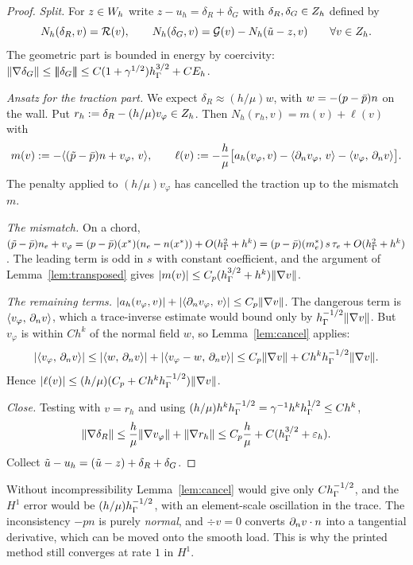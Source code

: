 \begin{proof}
\emph{Split.} For $z\in W_h$ write $z-u_h=\delta_R+\delta_G$ with $\delta_R,\delta_G\in Z_h$ defined by
\[
N_h(\delta_R,v)=\mathcal R(v),\qquad N_h(\delta_G,v)=\mathcal G(v)-N_h(\tilde u-z,v)\qquad\forall v\in Z_h .
\]
The geometric part is bounded in energy by coercivity: $\lVert \nabla\delta_G\rVert\le|\!|\!|\delta_G|\!|\!|\le C(1+\gamma^{1/2})h_\Gamma^{3/2}+CE_h$.

\emph{Ansatz for the traction part.} We expect $\delta_R\approx(h/\mu)w$, with $w=-(p-\bar p)n$ on the wall. Put $r_h:=\delta_R-(h/\mu)v_\varphi\in Z_h$. Then $N_h(r_h,v)=m(v)+\ell(v)$ with
\[
m(v):=-\langle (\tilde p-\bar p)n+v_\varphi,\, v\rangle,\qquad
\ell(v):=-\frac h\mu\bigl[a_h(v_\varphi,v)-\langle \partial_n v_\varphi,\, v\rangle-\langle v_\varphi,\, \partial_n v\rangle\bigr].
\]
The penalty applied to $(h/\mu)v_\varphi$ has cancelled the traction up to the mismatch $m$.

\emph{The mismatch.} On a chord, $(\tilde p-\bar p)n_e+v_\varphi=(p-\bar p)(x^\ast)(n_e-n(x^\ast))+O(h_\Gamma^2+h^k)=(p-\bar p)(m_e^\ast)\,s\,\tau_e+O(h_\Gamma^2+h^k)$. The leading term is odd in $s$ with constant coefficient, and the argument of Lemma~\ref{lem:transposed} gives $|m(v)|\le C_p(h_\Gamma^{3/2}+h^k)\lVert \nabla v\rVert$.

\emph{The remaining terms.} $|a_h(v_\varphi,v)|+|\langle \partial_n v_\varphi,\, v\rangle|\le C_p\lVert \nabla v\rVert$. The dangerous term is $\langle v_\varphi,\, \partial_n v\rangle$, which a trace-inverse estimate would bound only by $h_\Gamma^{-1/2}\lVert \nabla v\rVert$. But $v_\varphi$ is within $Ch^k$ of the normal field $w$, so Lemma~\ref{lem:cancel} applies:
\[
|\langle v_\varphi,\, \partial_n v\rangle|\le|\langle w,\, \partial_n v\rangle|+|\langle v_\varphi-w,\, \partial_n v\rangle|\le C_p\lVert \nabla v\rVert+Ch^kh_\Gamma^{-1/2}\lVert \nabla v\rVert.
\]
Hence $|\ell(v)|\le(h/\mu)(C_p+Ch^kh_\Gamma^{-1/2})\lVert \nabla v\rVert$.

\emph{Close.} Testing with $v=r_h$ and using $(h/\mu)h^kh_\Gamma^{-1/2}=\gamma^{-1}h^kh_\Gamma^{1/2}\le Ch^k$,
\[
\lVert \nabla\delta_R\rVert\le\frac h\mu\lVert \nabla v_\varphi\rVert+\lVert \nabla r_h\rVert\le C_p\frac h\mu+C(h_\Gamma^{3/2}+\varepsilon_h).
\]
Collect $\tilde u-u_h=(\tilde u-z)+\delta_R+\delta_G$.
\end{proof}

\begin{remark}
Without incompressibility Lemma~\ref{lem:cancel} would give only $Ch_\Gamma^{-1/2}$, and the $H^1$ error would be $(h/\mu)h_\Gamma^{-1/2}$, with an element-scale oscillation in the trace. The inconsistency $-pn$ is purely \emph{normal}, and $\div v=0$ converts $\partial_n v\cdot n$ into a tangential derivative, which can be moved onto the smooth load. This is why the printed method still converges at rate $1$ in $H^1$.
\end{remark}

